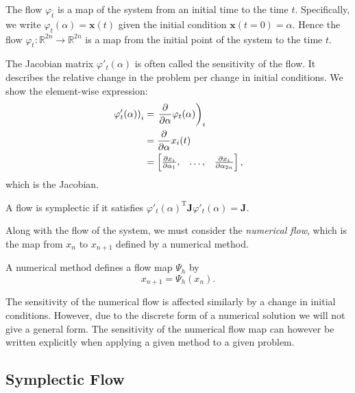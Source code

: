 \begin{definition}
	The flow $\varphi_t$ is a map of the system from an initial time to the time $t$.
	Specifically, we write $\varphi_t(\alpha) = \mathbf{x}(t)$ given the initial condition $\mathbf{x}(t=0) = \alpha$. Hence the flow $\varphi_t:\mathds{R}^{2n}\rightarrow \mathds{R}^{2n}$ is a map from the initial point of the system to the time $t$.
\end{definition}
The Jacobian matrix $\varphi'_t({\alpha})$ is often called the sensitivity of the flow.
It describes the relative change in the problem per change in initial conditions.
We show the element-wise expression: %
\begin{align*}
	\left. \varphi'_t(\alpha) \right)_i &= \left. \frac{\partial}{\partial \alpha} \varphi_t(\alpha) \right)_i \\
	&= \frac{\partial}{\partial \alpha} x_i(t) \\
	&= \begin{bmatrix}
		\frac{\partial x_i}{\partial \alpha_1}, & \mathellipsis, & \frac{\partial x_i}{\partial \alpha_{2n}}
	\end{bmatrix},
\end{align*}
which is the Jacobian.
\begin{definition}
	A flow is symplectic if it satisfies $\varphi'_t(\alpha)^\mathrm{T} \mathbf{J} \varphi'_t(\alpha) = \mathbf{J}.$
\end{definition}
Along with the flow of the system, we must consider the \textit{numerical flow},
which is the map from $x_n$ to $x_{n+1}$ defined by a numerical method.
\begin{definition}
	A numerical method defines a flow map $\Psi_h$ by
	\begin{equation*}
		x_{n+1} = \Psi_h(x_n).
	\end{equation*}
\end{definition}
The sensitivity of the numerical flow is affected similarly by a change in initial conditions. %
However, due to the discrete form of a numerical solution we will not give a general form.
The sensitivity of the numerical flow map can however be written explicitly when applying a given method to a given problem.

\subsection{Symplectic Flow}

